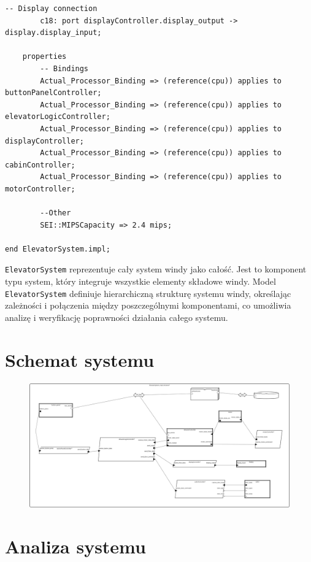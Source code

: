 \documentclass{article}
\begin{document}
\begin{lstlisting}[basicstyle=\ttfamily, keywordstyle=\bfseries]
        -- Display connection
        c18: port displayController.display_output -> display.display_input;
        
    properties
        -- Bindings
        Actual_Processor_Binding => (reference(cpu)) applies to buttonPanelController;
        Actual_Processor_Binding => (reference(cpu)) applies to elevatorLogicController;
        Actual_Processor_Binding => (reference(cpu)) applies to displayController;
        Actual_Processor_Binding => (reference(cpu)) applies to cabinController;
        Actual_Processor_Binding => (reference(cpu)) applies to motorController;

        --Other
    	SEI::MIPSCapacity => 2.4 mips;
        
end ElevatorSystem.impl;
    \end{lstlisting}

    \texttt{ElevatorSystem} reprezentuje cały system windy jako całość. Jest to komponent typu system, który integruje wszystkie elementy składowe windy. Model \texttt{ElevatorSystem} definiuje hierarchiczną strukturę systemu windy, określając zależności i połączenia między poszczególnymi komponentami, co umożliwia analizę i weryfikację poprawności działania całego systemu.



\section{Schemat systemu}


\begin{figure}[H]
    \centering
    \includegraphics[width=1.2\linewidth]{./images/schema.png}
\end{figure}

\section{Analiza systemu}
\end{document}
